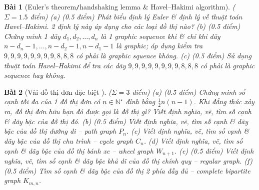 \documentclass{article}
\newtheorem{baitoan}{Bài}
\begin{document}
\begin{baitoan}[Euler's theorem{\tt/}handshaking lemma \& Havel--Hakimi algorithm]
    {\rm($\Sigma = 1.5$ điểm)} (a) {\rm(0.5 điểm)} Phát biểu định lý Euler \& định lý về thuật toán Havel--Hakimi. 2 định lý này áp dụng cho các loại đồ thị nào? (b) {\rm(0.5 điểm) \cite[P10.1.13, p. 368]{Shahriari2022}} Chứng minh 1 dãy $d_1,d_2,\ldots,d_n$ là 1 graphic sequence khi \& chỉ khi dãy $n - d_n - 1,\ldots,n - d_2 - 1,n - d_1 - 1$ là graphic; áp dụng kiểm tra $9,9,9,9,9,9,9,9,8,8,8$ có phải là graphic squence không. (c) {\rm(0.5 điểm)} Sử dụng thuật toán Havel--Hakimi để tra các dãy $9,9,9,9,9,9,9,9,8,8,8$ có phải là graphic sequence hay không.
\end{baitoan}

\begin{baitoan}[Vài đồ thị đơn đặc biệt \cite{Valiente2021}]
    {\rm($\Sigma = 3$ điểm)} (a) {\rm(0.5 điểm)} Chứng minh số cạnh tối đa của 1 đồ thị đơn có $n\in\mathbb{N}^\star$ đỉnh bằng $\frac{1}{2}n(n - 1)$. Khi đẳng thức xảy ra, đồ thị đơn hữu hạn đó được gọi là đồ thị gì? Viết định nghĩa, vẽ, tìm số cạnh \& dãy bậc của đồ thị đó. (b) {\rm(0.5 điểm)} Viết định nghĩa, vẽ, tìm số cạnh \& dãy bậc của đồ thị đường đi -- path graph $P_n$. (c) Viết định nghĩa, vẽ, tìm số cạnh \& dãy bậc của đồ thị chu trình -- cycle graph $C_n$. (d) Viết định nghĩa, vẽ, tìm số cạnh \& dãy bậc của đồ thị bánh xe -- wheel graph $W_{n+1}$. (e) {\rm(0.5 điểm)} Viết định nghĩa, vẽ, tìm số cạnh \& dãy bậc khả dĩ của đồ thị chính quy -- regular graph. (f) {\rm(0.5 điểm)} Tìm số cạnh \& dãy bậc của đồ thị 2 phía đầy đủ -- complete bipartite graph $K_{m,n}$.
\end{baitoan}


\printbibliography[heading=bibintoc]
    
\end{document}
